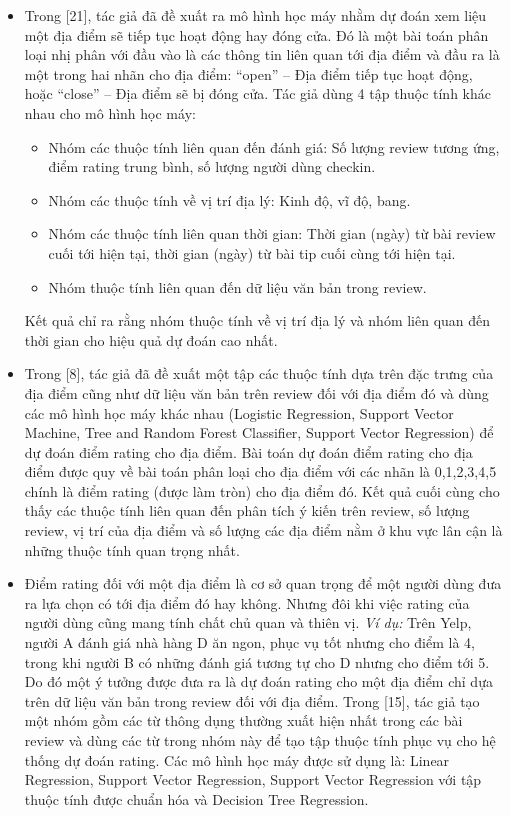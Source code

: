 \documentclass[12pt]{extarticle}
\begin{document}
			\begin{itemize}
				\item Trong [21], tác giả đã đề xuất ra mô hình học máy nhằm dự đoán xem liệu một địa điểm sẽ tiếp tục hoạt động hay đóng cửa. Đó là một bài toán phân loại nhị phân với đầu vào là các thông tin liên quan tới địa điểm và đầu ra là một trong hai nhãn cho địa điểm: “open” – Địa điểm tiếp tục hoạt động, hoặc “close” – Địa điểm sẽ bị đóng cửa. Tác giả dùng 4 tập thuộc tính khác nhau cho mô hình học máy:
					\begin{itemize}
						\item Nhóm các thuộc tính liên quan đến đánh giá: Số lượng review tương ứng, điểm rating trung bình, số lượng người dùng checkin.
						\item Nhóm các thuộc tính về vị trí địa lý: Kinh độ, vĩ độ, bang.
						\item Nhóm các thuộc tính liên quan thời gian: Thời gian (ngày) từ bài review cuối tới hiện tại, thời gian (ngày) từ bài tip cuối cùng tới hiện tại.
						\item Nhóm thuộc tính liên quan đến dữ liệu văn bản trong review.
					\end{itemize}
					Kết quả chỉ ra rằng nhóm thuộc tính về vị trí địa lý và nhóm liên quan đến thời gian cho hiệu quả dự đoán cao nhất.
				\item Trong [8], tác giả đã đề xuất một tập các thuộc tính dựa trên đặc trưng của địa điểm cũng như dữ liệu văn bản trên review đối với địa điểm đó và dùng các mô hình học máy khác nhau (Logistic Regression, Support Vector Machine, Tree and Random Forest Classifier, Support Vector Regression) để dự đoán điểm rating cho địa điểm. Bài toán dự đoán điểm rating cho địa điểm được quy về bài toán phân loại cho địa điểm với các nhãn là 0,1,2,3,4,5 chính là điểm rating (được làm tròn) cho địa điểm đó. Kết quả cuối cùng cho thấy các thuộc tính liên quan đến phân tích ý kiến trên review, số lượng review, vị trí của địa điểm và số lượng các địa điểm nằm ở khu vực lân cận là những thuộc tính quan trọng nhất.
				\item Điểm rating đối với một địa điểm là cơ sở quan trọng để một người dùng đưa ra lựa chọn có tới địa điểm đó hay không. Nhưng đôi khi việc rating của người dùng cũng mang tính chất chủ quan và thiên vị. \textit{Ví dụ:} Trên Yelp, người A đánh giá nhà hàng D ăn ngon, phục vụ tốt nhưng cho điểm là 4, trong khi người B có những đánh giá tương tự cho D nhưng cho điểm tới 5. Do đó một ý tưởng được đưa ra là dự đoán rating cho một địa điểm chỉ dựa trên dữ liệu văn bản trong review đối với địa điểm. Trong [15], tác giả tạo một nhóm gồm các từ thông dụng thường xuất hiện nhất trong các bài review và dùng các từ trong nhóm này để tạo tập thuộc tính phục vụ cho hệ thống dự đoán rating. Các mô hình học máy được sử dụng là: Linear Regression, Support Vector Regression, Support Vector Regression với tập thuộc tính được chuẩn hóa và Decision Tree Regression.

\end{itemize}
\end{document}
